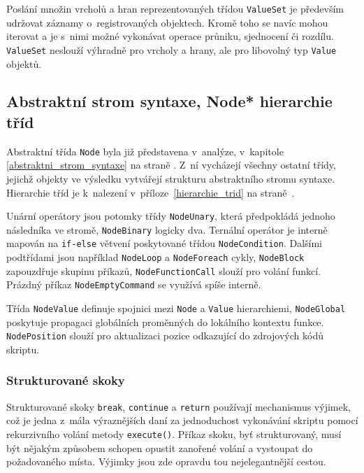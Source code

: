 \documentclass[11pt,twoside,a4paper]{book}
\begin{document}
Poslání množin vrcholů a hran reprezentovaných třídou \texttt{ValueSet} je především udržovat záznamy o~registrovaných objektech. Kromě toho se navíc mohou iterovat a je s~nimi možné vykonávat operace průniku, sjednocení či rozdílu. \texttt{ValueSet} neslouží výhradně pro vrcholy a hrany, ale pro libovolný typ \texttt{Value} objektů.


\subsection{Abstraktní strom syntaxe, Node* hierarchie tříd}

Abstraktní třída \texttt{Node} byla již představena v~analýze, v~kapitole \ref{abstraktni_strom_syntaxe} na straně \pageref{abstraktni_strom_syntaxe}. Z~ní vycházejí všechny ostatní třídy, jejichž objekty ve výsledku vytvářejí strukturu abstraktního stromu syntaxe. Hierarchie tříd je k~nalezení v~příloze~\ref{hierarchie_trid} na straně~\pageref{hierarchie_trid}.

Unární operátory jsou potomky třídy \texttt{NodeUnary}, která předpokládá jednoho následníka ve stromě, \texttt{NodeBinary} logicky dva. Ternální operátor je interně mapován na \texttt{if-else} větvení poskytované třídou \texttt{NodeCondition}. Dalšími podtřídami jsou například \texttt{Node\-Loop} a \texttt{No\-de\-For\-each} cykly, \texttt{NodeBlock} zapouzdřuje skupinu příkazů, \texttt{Node\-Function\-Call} slouží pro volání funkcí. Prázdný příkaz \texttt{NodeEmptyCommand} se využívá spíše interně.

Třída \texttt{NodeValue} definuje spojnici mezi \texttt{Node} a \texttt{Value} hierarchiemi, \texttt{NodeGlobal} poskytuje propagaci globálních proměnných do lokálního kontextu funkce. \texttt{NodePosition} slouží pro aktualizaci pozice odkazující do zdrojových kódů skriptu.


\subsubsection{Strukturované skoky}
\label{strukturovane_skoky}

Strukturované skoky \texttt{break}, \texttt{continue} a \texttt{return} používají mechanismus výjimek, což je jedna z~mála výraznějších daní za jednoduchost vykonávání skriptu pomocí rekurzivního volání metody \texttt{execute()}. Příkaz skoku, byť strukturovaný, musí být nějakým způsobem schopen opustit zanořené volání a vystoupat do požadovaného místa. Výjimky jsou zde opravdu tou nejelegantnější cestou.
\end{document}
